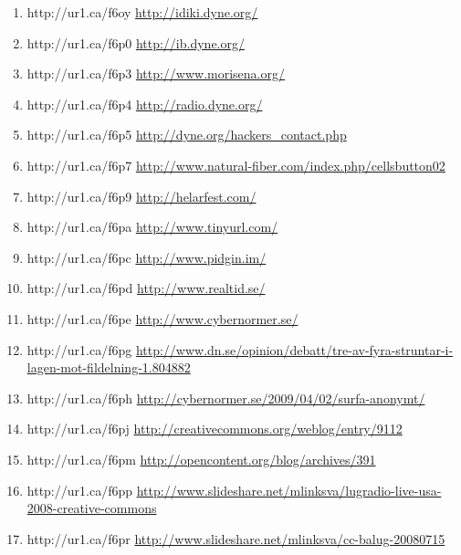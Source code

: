 \begin{enumerate}
    \item{http://ur1.ca/f6oy}
        \url{http://idiki.dyne.org/}

    \item{http://ur1.ca/f6p0}
        \url{http://ib.dyne.org/}

    \item{http://ur1.ca/f6p3}
        \url{http://www.morisena.org/}

    \item{http://ur1.ca/f6p4}
        \url{http://radio.dyne.org/}

    \item{http://ur1.ca/f6p5}
        \url{http://dyne.org/hackers\_contact.php}

    \item{http://ur1.ca/f6p7}
        \url{http://www.natural-fiber.com/index.php/cellsbutton02}

    \item{http://ur1.ca/f6p9}
        \url{http://helarfest.com/}

    \item{http://ur1.ca/f6pa}
        \url{http://www.tinyurl.com/}

    \item{http://ur1.ca/f6pc}
        \url{http://www.pidgin.im/}

    \item{http://ur1.ca/f6pd}
        \url{http://www.realtid.se/}

    \item{http://ur1.ca/f6pe}
        \url{http://www.cybernormer.se/}

    \item{http://ur1.ca/f6pg}
        \url{http://www.dn.se/opinion/debatt/tre-av-fyra-struntar-i-lagen-mot-fildelning-1.804882}

    \item{http://ur1.ca/f6ph}
        \url{http://cybernormer.se/2009/04/02/surfa-anonymt/}

    \item{http://ur1.ca/f6pj}
        \url{http://creativecommons.org/weblog/entry/9112}

    \item{http://ur1.ca/f6pm}
        \url{http://opencontent.org/blog/archives/391}

    \item{http://ur1.ca/f6pp}
        \url{http://www.slideshare.net/mlinksva/lugradio-live-usa-2008-creative-commons}

    \item{http://ur1.ca/f6pr}
        \url{http://www.slideshare.net/mlinksva/cc-balug-20080715}


\end{enumerate}
